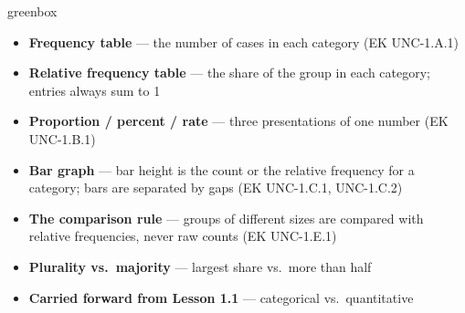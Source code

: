 \documentclass[10pt]{article}
\begin{document}
\boxguard
\begin{skillbox}{greenbox}
\begin{minipage}[t]{0.48\linewidth}
    \begin{itemize}
        \item \textbf{Frequency table} --- the number of cases in each category (EK UNC-1.A.1)
        \item \textbf{Relative frequency table} --- the share of the group in each category;
              entries always sum to 1
        \item \textbf{Proportion / percent / rate} --- three presentations of one number
              (EK UNC-1.B.1)
    \end{itemize}
\end{minipage}
\hfill
\begin{minipage}[t]{0.48\linewidth}
    \begin{itemize}
        \item \textbf{Bar graph} --- bar height is the count or the relative frequency for a
              category; bars are separated by gaps (EK UNC-1.C.1, UNC-1.C.2)
        \item \textbf{The comparison rule} --- groups of different sizes are compared with
              relative frequencies, never raw counts (EK UNC-1.E.1)
        \item \textbf{Plurality vs.\ majority} --- largest share vs.\ more than half
        \item \textbf{Carried forward from Lesson 1.1} --- categorical vs.\ quantitative
    \end{itemize}
\end{minipage}
\end{skillbox}
\end{document}
